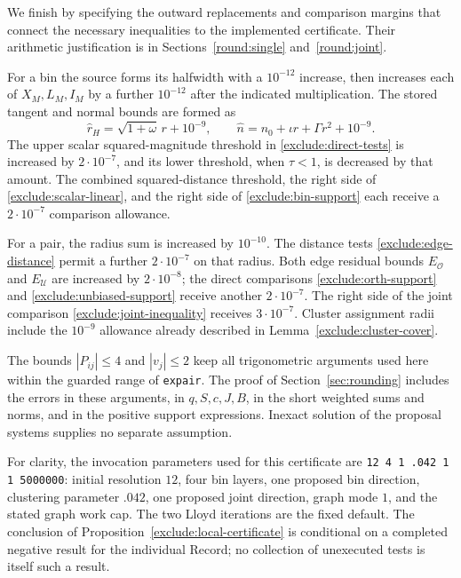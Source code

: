 We finish by specifying the outward replacements and comparison margins
that connect the necessary inequalities to the implemented certificate.
Their arithmetic justification is in Sections~\ref{round:single}
and~\ref{round:joint}.

For a bin the source forms its halfwidth with a $10^{-12}$ increase,
then increases each of $X_M,L_M,I_M$ by a further $10^{-12}$ after
the indicated multiplication.  The stored tangent and normal bounds
are formed as
\[
 \widehat r_H=\sqrt{1+\omega}\,r+10^{-9},\qquad
 \widehat n=n_0+\iota r+\Gamma r^2+10^{-9}.
\]
The upper scalar squared-magnitude threshold in
\eqref{exclude:direct-tests} is increased by $2\cdot10^{-7}$,
and its lower threshold, when $\tau<1$, is decreased by that amount.
The combined squared-distance threshold, the right side of
\eqref{exclude:scalar-linear}, and the right side of
\eqref{exclude:bin-support} each receive a $2\cdot10^{-7}$ comparison
allowance.

For a pair, the radius sum is increased by $10^{-10}$.
The distance tests \eqref{exclude:edge-distance} permit a further
$2\cdot10^{-7}$ on that radius.  Both edge residual bounds
$E_{\mathcal O}$ and $E_{\mathcal U}$ are increased by $2\cdot10^{-8}$;
the direct comparisons \eqref{exclude:orth-support} and
\eqref{exclude:unbiased-support} receive another $2\cdot10^{-7}$.
The right side of the joint comparison
\eqref{exclude:joint-inequality} receives $3\cdot10^{-7}$.
Cluster assignment radii include the $10^{-9}$ allowance already
described in Lemma~\ref{exclude:cluster-cover}.

The bounds $|P_{ij}|\le4$ and $|v_j|\le2$ keep all trigonometric
arguments used here within the guarded range of \texttt{expair}.
The proof of Section~\ref{sec:rounding} includes the errors in these
arguments, in $q,S,c,J,B$, in the short weighted sums and norms, and in
the positive support expressions.  Inexact solution of the proposal
systems supplies no separate assumption.

For clarity, the invocation parameters used for this certificate are
\texttt{12 4 1 .042 1 1 5000000}: initial resolution $12$, four bin
layers, one proposed bin direction, clustering parameter $.042$,
one proposed joint direction, graph mode $1$, and the stated graph
work cap.  The two Lloyd iterations are the fixed default.
The conclusion of Proposition~\ref{exclude:local-certificate} is
conditional on a completed negative result for the individual Record;
no collection of unexecuted tests is itself such a result.
